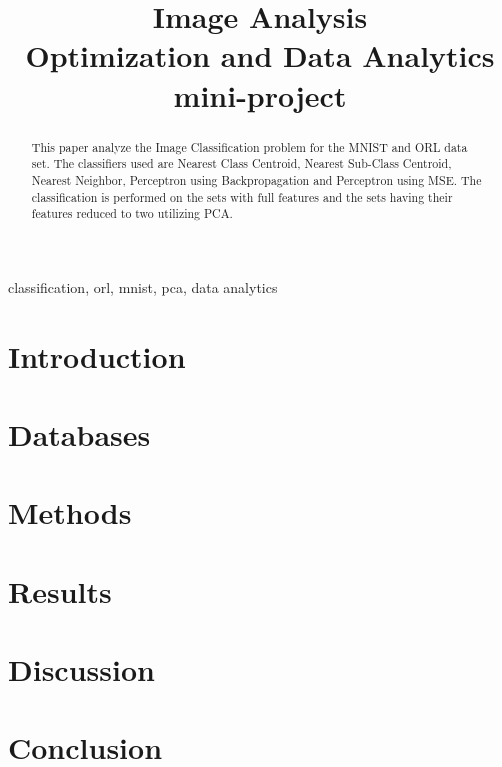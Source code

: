 \documentclass[conference]{IEEEtran}
\begin{document}
\title{Image Analysis\\
{\footnotesize Optimization and Data Analytics mini-project}}

\author{
}

\maketitle

\begin{abstract}
This paper analyze the Image Classification problem for the MNIST and ORL data set. The classifiers used are Nearest Class Centroid, Nearest Sub-Class Centroid, Nearest Neighbor, Perceptron using Backpropagation and Perceptron using MSE. The classification is performed on the sets with full features and the sets having their features reduced to two utilizing PCA. 
\end{abstract}

\begin{IEEEkeywords}
classification, orl, mnist, pca, data analytics
\end{IEEEkeywords}

\section{Introduction}


\section{Databases}


\section{Methods}


\newpage
\section{Results}


\section{Discussion}


\section{Conclusion}



\printbibliography

\onecolumn
\newpage
{}
\listoftodos[Notes]
\end{document}
